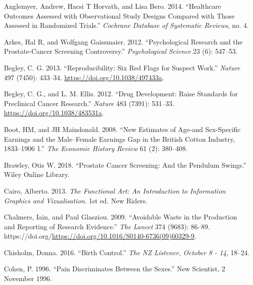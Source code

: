\documentclass[
  10ptls,
  b5paper]{book}
\newlength{\cslhangindent}
\newlength{\cslentryspacingunit} %
\newenvironment{CSLReferences}[2] %
 {%
  \setlength{\parindent}{0pt}
  \ifodd #1
  \let\oldpar\par
  \def\par{\hangindent=\cslhangindent\oldpar}
  \fi
  \setlength{\parskip}{#2\cslentryspacingunit}
 }%
 {}
\begin{document}
\hypertarget{refs}{}
\begin{CSLReferences}{1}{0}
\leavevmode{}%
Anglemyer, Andrew, Hacsi T Horvath, and Lisa Bero. 2014. {``Healthcare Outcomes Assessed with Observational Study Designs Compared with Those Assessed in Randomized Trials.''} \emph{Cochrane Database of Systematic Reviews}, no. 4.

\leavevmode{}%
Arkes, Hal R, and Wolfgang Gaissmaier. 2012. {``Psychological Research and the Prostate-Cancer Screening Controversy.''} \emph{Psychological Science} 23 (6): 547--53.

\leavevmode{}%
Begley, C. G. 2013. {``Reproducibility: Six Red Flags for Suspect Work.''} \emph{Nature} 497 (7450): 433--34. \url{https://doi.org/10.1038/497433a}.

\leavevmode{}%
Begley, C. G., and L. M. Ellis. 2012. {``Drug Development: Raise Standards for Preclinical Cancer Research.''} \emph{Nature} 483 (7391): 531--33. \url{https://doi.org/10.1038/483531a}.

\leavevmode{}%
Boot, HM, and JH Maindonald. 2008. {``New Estimates of Age-and Sex-Specific Earnings and the Male--Female Earnings Gap in the British Cotton Industry, 1833--1906 1.''} \emph{The Economic History Review} 61 (2): 380--408.

\leavevmode{}%
Brawley, Otis W. 2018. {``Prostate Cancer Screening: And the Pendulum Swings.''} Wiley Online Library.

\leavevmode{}%
Cairo, Alberto. 2013. \emph{The Functional Art: An Introduction to Information Graphics and Vizualisation}. 1st ed. New Riders.

\leavevmode{}%
Chalmers, Iain, and Paul Glasziou. 2009. {``Avoidable Waste in the Production and Reporting of Research Evidence.''} \emph{The Lancet} 374 (9683): 86--89. https://doi.org/\url{https://doi.org/10.1016/S0140-6736(09)60329-9}.

\leavevmode{}%
Chisholm, Donna. 2016. {``Birth Control.''} \emph{The NZ Listener, October 8 - 14}, 18--24.

\leavevmode{}%
Cohen, P. 1996. {``Pain Discriminates Between the Sexes.''} New Scientist, 2 November 1996.


\end{CSLReferences}
\end{document}

